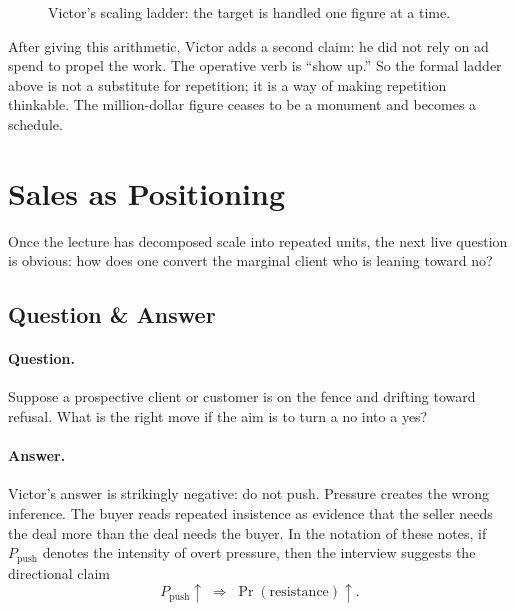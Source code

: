\begin{figure}
\centering
{}
\caption{Victor's scaling ladder: the target is handled one figure at a time.}
\end{figure}

After giving this arithmetic, Victor adds a second claim: he did not rely on ad spend to propel the work. The operative verb is ``show up.'' So the formal ladder above is not a substitute for repetition; it is a way of making repetition thinkable. The million-dollar figure ceases to be a monument and becomes a schedule.

\section{Sales as Positioning}

Once the lecture has decomposed scale into repeated units, the next live question is obvious: how does one convert the marginal client who is leaning toward no?

\subsection{Question \& Answer}

\paragraph{Question.}
Suppose a prospective client or customer is on the fence and drifting toward refusal. What is the right move if the aim is to turn a no into a yes?

\paragraph{Answer.}
Victor's answer is strikingly negative: do not push. Pressure creates the wrong inference. The buyer reads repeated insistence as evidence that the seller needs the deal more than the deal needs the buyer. In the notation of these notes, if \(P_{\text{push}}\) denotes the intensity of overt pressure, then the interview suggests the directional claim
\begin{equation}
P_{\text{push}} \uparrow \;\Rightarrow\; \Pr(\text{resistance}) \uparrow.
\end{equation}


